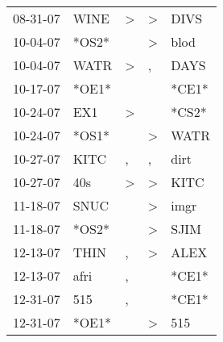 \begin{supertabular}{p{0.07\textwidth}p{0.06\textwidth}p{0.02\textwidth}p{0.02\textwidth}p{0.06\textwidth}}
          08-31-07\textsuperscript{} &           WINE\textsuperscript{} &     \textgreater &     \textgreater &           DIVS\textsuperscript{} \\
          10-04-07\textsuperscript{} &                            *OS2* &                  &     \textgreater &           blod\textsuperscript{} \\
          10-04-07\textsuperscript{} &           WATR\textsuperscript{} &     \textgreater &                , &           DAYS\textsuperscript{} \\
          10-17-07\textsuperscript{} &                            *OE1* &                  &                  &                            *CE1* \\
          10-24-07\textsuperscript{} &            EX1\textsuperscript{} &     \textgreater &                  &                            *CS2* \\
          10-24-07\textsuperscript{} &                            *OS1* &                  &     \textgreater &           WATR\textsuperscript{} \\
          10-27-07\textsuperscript{} &           KITC\textsuperscript{} &                , &                , &           dirt\textsuperscript{} \\
          10-27-07\textsuperscript{} &            40s\textsuperscript{} &     \textgreater &     \textgreater &           KITC\textsuperscript{} \\
          11-18-07\textsuperscript{} &           SNUC\textsuperscript{} &                  &     \textgreater &           imgr\textsuperscript{} \\
          11-18-07\textsuperscript{} &                            *OS2* &                  &     \textgreater &           SJIM\textsuperscript{} \\
          12-13-07\textsuperscript{} &           THIN\textsuperscript{} &                , &     \textgreater &           ALEX\textsuperscript{} \\
          12-13-07\textsuperscript{} &           afri\textsuperscript{} &                , &                  &                            *CE1* \\
          12-31-07\textsuperscript{} &            515\textsuperscript{} &                , &                  &                            *CE1* \\
          12-31-07\textsuperscript{} &                            *OE1* &                  &     \textgreater &            515\textsuperscript{} \\

\end{supertabular}
